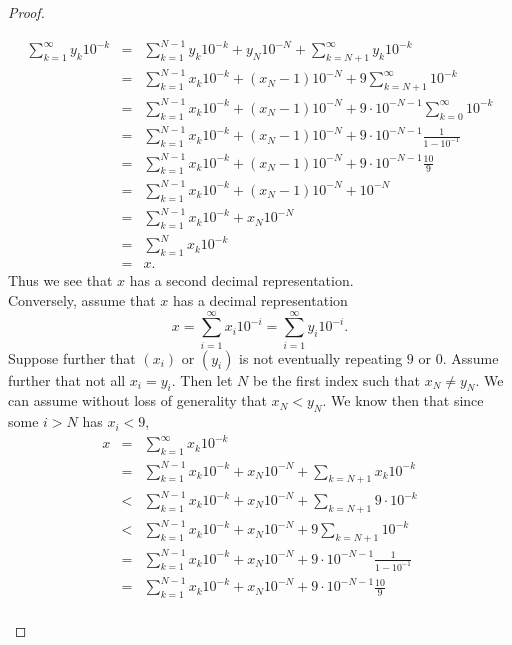 \begin{proof}
\begin{enumerate}
        \begin{eqnarray*}
            \sum_{k=1}^\infty y_k 10^{-k}
            & = & \sum_{k=1}^{N-1} y_k 10^{-k} + y_N 10^{-N} + \sum_{k=N+1}^\infty y_k 10^{-k}\\
            & = & \sum_{k=1}^{N-1} x_k 10^{-k} + (x_N - 1) 10^{-N} + 9\sum_{k=N+1}^\infty 10^{-k}\\
            & = & \sum_{k=1}^{N-1} x_k 10^{-k} + (x_N - 1) 10^{-N} + 9\cdot 10^{-N-1}\sum_{k=0}^\infty 10^{-k}\\
            & = & \sum_{k=1}^{N-1} x_k 10^{-k} + (x_N - 1) 10^{-N} + 9\cdot 10^{-N-1}\frac{1}{1 - 10^{-1}}\\
            & = & \sum_{k=1}^{N-1} x_k 10^{-k} + (x_N - 1) 10^{-N} + 9\cdot 10^{-N-1}\frac{10}{9}\\
            & = & \sum_{k=1}^{N-1} x_k 10^{-k} + (x_N - 1) 10^{-N} + 10^{-N}\\
            & = & \sum_{k=1}^{N-1} x_k 10^{-k} + x_N 10^{-N}\\
            & = & \sum_{k=1}^{N} x_k 10^{-k}\\
            & = & x.
        \end{eqnarray*}
        Thus we see that $x$ has a second decimal representation. \\
        Conversely, assume that $x$ has a decimal representation
        $$x = \sum_{i=1}^\infty x_i 10^{-i} = \sum_{i=1}^\infty y_i 10^{-i}.$$
        Suppose further that $(x_i)$ or $(y_i)$ is not eventually repeating $9$ or $0$. Assume further that not all $x_i = y_i$. Then let $N$ be the first index such that $x_N\neq y_N$. We can assume without loss of generality that $x_N < y_N$. We know then that since some $i>N$ has $x_i<9$,
        \begin{eqnarray*}
            x
            & = & \sum_{k=1}^\infty x_k 10^{-k}\\
            & = & \sum_{k=1}^{N-1} x_k 10^{-k} + x_N 10^{-N} + \sum_{k=N+1} x_k 10^{-k}\\
            & < & \sum_{k=1}^{N-1} x_k 10^{-k} + x_N 10^{-N} + \sum_{k=N+1} 9\cdot 10^{-k}\\
            & < & \sum_{k=1}^{N-1} x_k 10^{-k} + x_N 10^{-N} + 9\sum_{k=N+1} 10^{-k}\\
            & = & \sum_{k=1}^{N-1} x_k 10^{-k} + x_N 10^{-N} + 9\cdot 10^{-N-1}\frac{1}{1 - 10^{-1}}\\
            & = & \sum_{k=1}^{N-1} x_k 10^{-k} + x_N 10^{-N} + 9\cdot 10^{-N-1}\frac{10}{9}\\

\end{eqnarray*}
\end{enumerate}
\end{proof}
